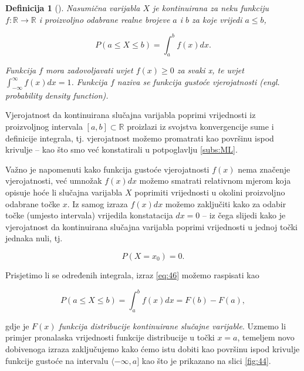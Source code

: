 \documentclass[a4paper,12pt,oneside]{memoir}
\newtheorem{definition}{Definicija}[chapter]
\begin{document}
                \begin{definition}[\cite{Dekking}]
                    Nasumična varijabla $X$ je kontinuirana za neku funkciju $f:\mathbb{R}\to \mathbb{R}$ i proizvoljno odabrane realne brojeve $a$ i $b$ za koje vrijedi $a\leq b$,

                    \begin{equation}
                        P(a\leq X\leq b)=\displaystyle\int_{a}^{b}f(x)dx.
                        \label{eq:46}
                    \end{equation}

                    Funkcija $f$ mora zadovoljavati uvjet $f(x)\geq 0$ za svaki x, te uvjet $\int_{-\infty}^{\infty}f(x)dx=1$. Funkcija $f$ naziva se funkcija gustoće vjerojatnosti (engl. probability density function).
                \end{definition}

                Vjerojatnost da kontinuirana slučajna varijabla poprimi vrijednosti iz proizvoljnog intervala $\left[a,b\right]\subset\mathbb{R}$ proizlazi iz svojstva konvergencije sume i definicije integrala, tj. vjerojatnost možemo promatrati kao površinu ispod krivulje -- kao što smo već konstatirali u potpoglavlju \ref{subs:ML}.

                Važno je napomenuti kako funkcija gustoće vjerojatnosti $f(x)$ nema značenje vjerojatnosti, već umnožak $f(x)dx$ možemo smatrati relativnom mjerom koja opisuje hoće li slučajna varijabla $X$ poprimiti vrijednosti u okolini proizvoljno odabrane točke $x$. Iz samog izraza $f(x)dx$ možemo zaključiti kako za odabir točke (umjesto intervala) vrijedila konstatacija $dx=0$ -- iz čega slijedi kako je vjerojatnost da kontinuirana slučajna varijabla poprimi vrijednosti u jednoj točki jednaka nuli, tj.

                \begin{equation}
                    P(X=x_0)=0.                    
                \end{equation}
                
                Prisjetimo li se određenih integrala, izraz \eqref{eq:46} možemo raspisati kao

                \begin{equation}
                    P(a\leq X\leq b)=\displaystyle\int_{a}^{b}f(x)dx=F(b)-F(a),
                \end{equation}
                
                gdje je $F(x)$ \textit{funkcija distribucije kontinuirane slučajne varijable}. Uzmemo li primjer pronalaska vrijednosti funkcije distribucije u točki $x=a$, temeljem novo dobivenoga izraza zaključujemo kako ćemo istu dobiti kao površinu ispod krivulje funkcije gustoće na intervalu $\langle-\infty,a]$ kao što je prikazano na slici \ref{fig:44}.
\end{document}
